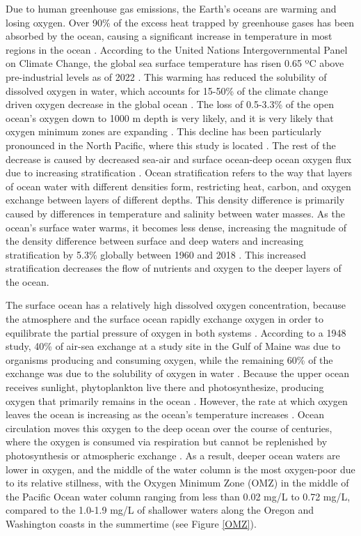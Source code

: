 \documentclass[12pt,twoside]{reedthesis}
\begin{document}
Due to human greenhouse gas emissions, the Earth's oceans are warming and losing oxygen. Over 90\% of the excess heat trapped by greenhouse gases has been absorbed by the ocean, causing a significant increase in temperature in most regions in the ocean \autocite{Bindoff2013}. According to the United Nations Intergovernmental Panel on Climate Change, the global sea surface temperature has risen 0.65 ºC above pre-industrial levels as of 2022 \autocite{Portner2019}. This warming has reduced the solubility of dissolved oxygen in water, which accounts for 15-50\% of the climate change driven oxygen decrease in the global ocean \autocite{Helm2011, Ito2017, Schmidtko2017}. The loss of 0.5-3.3\% of the open ocean's oxygen down to 1000 m depth is very likely, and it is very likely that oxygen minimum zones are expanding \autocite{Bindoff2013}. This decline has been particularly pronounced in the North Pacific, where this study is located \autocite{Bindoff2013, Ito2017}. The rest of the decrease is caused by decreased sea-air and surface ocean-deep ocean oxygen flux due to increasing stratification \autocite{Barth2024, Mancini2024, Portner2019}. Ocean stratification refers to the way that layers of ocean water with different densities form, restricting heat, carbon, and oxygen exchange between layers of different depths. This density difference is primarily caused by differences in temperature and salinity between water masses. As the ocean's surface water warms, it becomes less dense, increasing the magnitude of the density difference between surface and deep waters and increasing stratification by 5.3\% globally between 1960 and 2018 \autocite{Li2020a}. This increased stratification decreases the flow of nutrients and oxygen to the deeper layers of the ocean. 

The surface ocean has a relatively high dissolved oxygen concentration, because the atmosphere and the surface ocean rapidly exchange oxygen in order to equilibrate the partial pressure of oxygen in both systems \autocite{Ito2010}. According to a 1948 study, 40\% of air-sea exchange at a study site in the Gulf of Maine was due to organisms producing and consuming oxygen, while the remaining 60\% of the exchange was due to the solubility of oxygen in water \autocite{Redfield1948}. Because the upper ocean receives sunlight, phytoplankton live there and photosynthesize, producing oxygen that primarily remains in the ocean \autocite{Li2020}. However, the rate at which oxygen leaves the ocean is increasing as the ocean's temperature increases \autocite{Li2020}. Ocean circulation moves this oxygen to the deep ocean over the course of centuries, where the oxygen is consumed via respiration but cannot be replenished by photosynthesis or atmospheric exchange \autocite{Karstensen2008, Deutsch2024, Ito2010}. As a result, deeper ocean waters are lower in oxygen, and the middle of the water column is the most oxygen-poor due to its relative stillness, with the Oxygen Minimum Zone (OMZ) in the middle of the Pacific Ocean water column ranging from less than 0.02 mg/L to 0.72 mg/L, compared to the 1.0-1.9 mg/L of shallower waters along the Oregon and Washington coasts in the summertime \autocite{Karstensen2008, Deutsch2024, Barth2024, Pierce2012, Wyrtki1962} (see Figure \ref{OMZ}).
\end{document}
